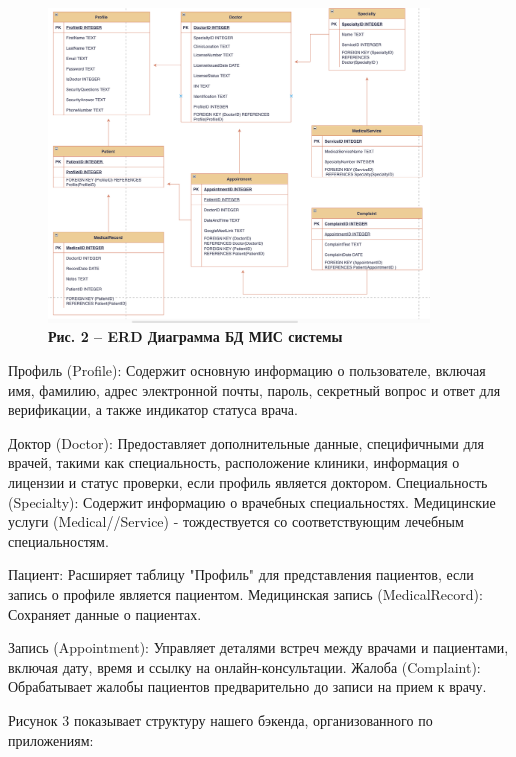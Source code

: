 \begin{figure}[H]
	\centering
	\includegraphics[width=0.9\textwidth]{assets/152}
	\caption*{\bfseries Рис. 2 -- ERD Диаграмма БД МИС системы}
\end{figure}

\begin{multicols}{2}

Профиль (Profile): Содержит основную информацию о пользователе, включая
имя, фамилию, адрес электронной почты, пароль, секретный вопрос и ответ
для верификации, а также индикатор статуса врача.

Доктор (Doctor): Предоставляет дополнительные данные, специфичными для
врачей, такими как специальность, расположение клиники, информация о
лицензии и статус проверки, если профиль является доктором.
Специальность (Specialty): Содержит информацию о врачебных
специальностях. Медицинские услуги (Medical//Service) - тождествуется со
соответствующим лечебным специальностям.

Пациент: Расширяет таблицу "Профиль" для представления пациентов, если
запись о профиле является пациентом. Медицинская запись (MedicalRecord):
Сохраняет данные о пациентах.

Запись (Appointment): Управляет деталями встреч между врачами и
пациентами, включая дату, время и ссылку на онлайн-консультации. Жалоба
(Complaint): Обрабатывает жалобы пациентов предварительно до записи на
прием к врачу.

Рисунок 3 показывает структуру нашего бэкенда, организованного по
приложениям:
\end{multicols}

